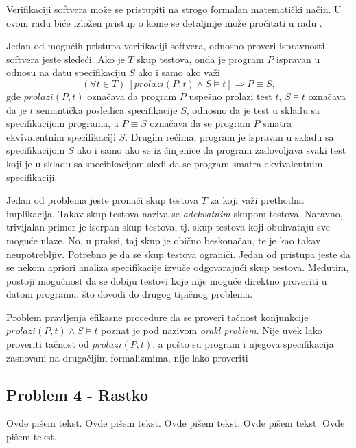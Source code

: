 \documentclass[a4paper]{article}
\begin{document}
\par Verifikaciji softvera može se pristupiti na strogo formalan matematički način. U ovom radu biće izložen pristup o kome se detaljnije može pročitati u radu \cite{verify}.

\par Jedan od mogućih pristupa verifikaciji softvera, odnosno proveri ispravnosti softvera jeste sledeći. Ako je $T$ skup testova, onda je program $P$ ispravan u odnosu na datu specifikaciju $S$ ako i samo ako važi
$$(\forall t\in T)\ [prolazi(P,t)\wedge S\models t]\Rightarrow P\equiv S,$$
gde $prolazi(P,t)$ označava da program $P$ uspešno prolazi test $t$, $S\models t$ označava da je $t$ semantička posledica specifikacije $S$, odnosno da je test u skladu sa specifikacijom programa, a $P\equiv S$ označava da se program $P$ smatra ekvivalentnim specifikaciji $S$. Drugim rečima, program je ispravan u skladu sa specifikacijom $S$ ako i samo ako se iz činjenice da program zadovoljava svaki test koji je u skladu sa specifikacijom sledi da se program smatra ekvivalentnim specifikaciji.

\par Jedan od problema jeste pronaći skup testova $T$ za koji važi prethodna implikacija. Takav skup testova naziva se \emph{adekvatnim} skupom testova. Naravno, trivijalan primer je iscrpan skup testova, tj. skup testova koji obuhvataju sve moguće ulaze. No, u praksi, taj skup je obično beskonačan, te je kao takav neupotrebljiv. Potrebno je da se skup testova ograniči. Jedan od pristupa jeste da se nekom apriori analiza specifikacije izvuče odgovarajući skup testova. Međutim, postoji mogućnost da se dobiju testovi koje nije moguće direktno proveriti u datom programu, što dovodi do drugog tipičnog problema.

\par Problem pravljenja efikasne procedure da se proveri tačnost konjunkcije $prolazi(P,t)\wedge S\models t$ poznat je pod nazivom \emph{orakl problem}. Nije uvek lako proveriti tačnost od $prolazi(P,t)$, a pošto su program i njegova specifikacija zasnovani na drugačijim formalizmima, nije lako proveriti 

\subsection{Problem 4 - Rastko}

Ovde pišem tekst.
Ovde pišem tekst.
Ovde pišem tekst.
Ovde pišem tekst.
Ovde pišem tekst.
\end{document}
